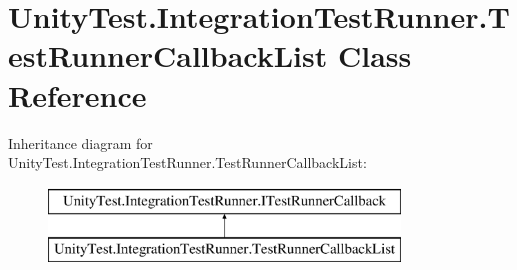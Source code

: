 \hypertarget{class_unity_test_1_1_integration_test_runner_1_1_test_runner_callback_list}{}\section{Unity\+Test.\+Integration\+Test\+Runner.\+Test\+Runner\+Callback\+List Class Reference}
\label{class_unity_test_1_1_integration_test_runner_1_1_test_runner_callback_list}
Inheritance diagram for Unity\+Test.\+Integration\+Test\+Runner.\+Test\+Runner\+Callback\+List\+:\begin{figure}[H]
\begin{center}
\leavevmode
\includegraphics[height=2.000000cm]{class_unity_test_1_1_integration_test_runner_1_1_test_runner_callback_list}
\end{center}
\end{figure}
